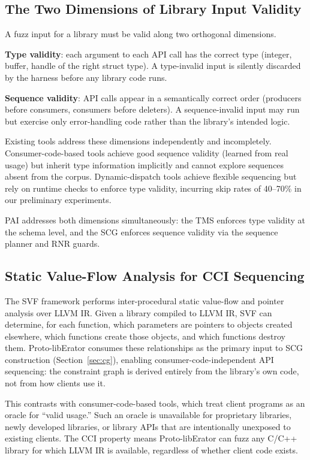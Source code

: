 \documentclass[sigconf,anonymous]{acmart}
\begin{document}
\subsection{The Two Dimensions of Library Input Validity}

A fuzz input for a library must be valid along two orthogonal
dimensions.

\textbf{Type validity}: each argument to each API call has the correct
type (integer, buffer, handle of the right struct type).  A type-invalid
input is silently discarded by the harness before any library code runs.

\textbf{Sequence validity}: API calls appear in a semantically correct
order (producers before consumers, consumers before deleters).
A sequence-invalid input may run but exercise only error-handling code
rather than the library's intended logic.

Existing tools address these dimensions independently and incompletely.
Consumer-code-based tools \cite{fudge19,fuzzgen19,utopia22} achieve good
sequence validity (learned from real usage) but inherit type information
implicitly and cannot explore sequences absent from the corpus.
Dynamic-dispatch tools \cite{hopper_ccs23,nexzzer_ndss25} achieve flexible
sequencing but rely on runtime checks to enforce type validity,
incurring skip rates of 40--70\% in our preliminary experiments.

PAI addresses both dimensions simultaneously: the TMS enforces type
validity at the schema level, and the SCG enforces sequence validity via
the sequence planner and RNR guards.

\subsection{Static Value-Flow Analysis for CCI Sequencing}
\label{sec:svf_background}

The SVF framework \cite{svf_tool} performs inter-procedural static
value-flow and pointer analysis over LLVM IR.  Given a library compiled
to LLVM IR, SVF can determine, for each function, which parameters are
pointers to objects created elsewhere, which functions create those
objects, and which functions destroy them.  Proto-libErator consumes
these relationships as the primary input to SCG construction
(Section~\ref{sec:cg}), enabling consumer-code-independent API sequencing:
the constraint graph is derived entirely from the library's own code,
not from how clients use it.

This contrasts with consumer-code-based tools, which treat client
programs as an oracle for ``valid usage.''  Such an oracle is
unavailable for proprietary libraries, newly developed libraries, or
library APIs that are intentionally unexposed to existing clients.
The CCI property means Proto-libErator can fuzz any C/C++ library
for which LLVM IR is available, regardless of whether client code exists.
\end{document}
